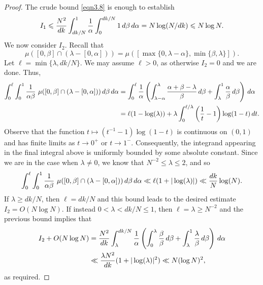 \documentclass[10pt,a4paper]{amsart}
\def\d{{\,{\rm d}}}
\begin{document}
\begin{proof}
The crude bound \eqref{eqn3.8} is enough to establish
\begin{equation*}
    I_1\leqslant \frac{N^2}{dk}\int_{dk/N}^1 \frac{1}{\alpha}\int_0^{dk/N} 1 \d\beta\d\alpha =N\log(N/dk) \leqslant N\log N.
\end{equation*}
We now consider $I_2$. Recall that
\begin{equation*}
    \mu( [0, \beta] \cap (\lambda - [0, \alpha] ) ) = \mu([\max\{0,\lambda -\alpha\}, \min\{\beta,\lambda\}]).
\end{equation*}
Let $\ell = \min\{ \lambda,dk/N\}$. We may assume $\ell>0$, as otherwise $I_2=0$ and we are done. Thus, 
\begin{align*}
    \int_0^\ell \int_{0}^1 \frac{1}{\alpha \beta} \ \mu( [0, \beta] \cap (\lambda - [0, \alpha] ) )\d\beta \d \alpha  &= \int_0^\ell \frac{1}{\alpha}\left(\int_{\lambda -\alpha }^\lambda \frac{\alpha +\beta-\lambda}{\beta}\d\beta +\int_\lambda^1\frac{\alpha}{\beta}\d\beta \right)\d\alpha\\
    &= \ell(1-\log(\lambda)) + \lambda\int_0^{\ell/\lambda}\left(\frac{1}{t} - 1\right)\log(1-t)\d t.
\end{align*}
Observe that the function $t\mapsto (t^{-1}-1)\log(1-t)$ is continuous on $(0,1)$ and has finite limits as $t\to 0^+$ or $t\to 1^-$. Consequently, the integrand appearing in the final integral above is uniformly bounded by some absolute constant. Since we are in the case when $\lambda\neq 0$, we know that $N^{-2}\leqslant \lambda \leqslant 2$, and so
\begin{equation*}
    \int_0^\ell \int_{0}^1 \frac{1}{\alpha \beta} \ \mu( [0, \beta] \cap (\lambda - [0, \alpha] ) )\d\beta \d \alpha \ll \ell(1+|\log(\lambda)|)\ll \frac{dk}{N}\log(N).
\end{equation*}
If $\lambda\geqslant dk/N$, then $\ell=dk/N$ and this bound leads to the desired estimate $I_2=O(N\log N)$. If instead $0<\lambda<dk/N\leqslant 1$, then $\ell=\lambda\geqslant N^{-2}$ and the previous bound implies that
\begin{align*}
    I_2 + O(N\log N) &= \frac{N^2}{dk}\int_\lambda^{dk/N}\frac{1}{\alpha}\left(\int_0^{\lambda}\frac{\beta}{\beta}\d\beta+\int_\lambda^1\frac{\lambda}{\beta}\d\beta\right)\d\alpha\\
    &\ll \frac{\lambda N^2}{dk}(1+|\log(\lambda)|^2) \ll N(\log N)^2,
\end{align*}
as required. 
\end{proof}
\end{document}
